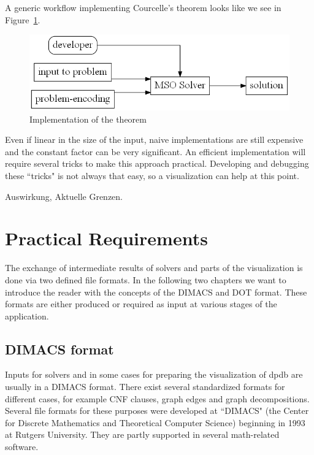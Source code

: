 \documentclass[a4paper, 12pt, bibliography=totoc]{scrartcl}
\begin{document}
\noindent
A generic workflow implementing Courcelle's theorem looks like we see in Figure~\ref{fig:UsageCourcelle}.
\begin{figure}[H]
	\includegraphics[height=0.2\textheight]{images/UsageCourcelle.gv.png}
	\caption{Implementation of the theorem}
	\label{fig:UsageCourcelle}
\end{figure}

Even if linear in the size of the input, naive implementations are still expensive and 
the constant factor can be very significant. An efficient implementation will require several tricks to make this approach practical. Developing and debugging these ``tricks" is not always that easy, so a visualization can help at this point.\smallskip 

Auswirkung, Aktuelle Grenzen.

\newpage
\section{Practical Requirements}\label{sec:practicalreq}
The exchange of intermediate results of solvers and parts of the visualization is done via two defined file formats. In the following two chapters we want to introduce the reader with the concepts of the DIMACS and DOT format. These formats are either produced or required as input at various stages of the application.
  
\subsection{DIMACS format}

Inputs for solvers and in some cases for preparing the visualization of dpdb are usually in a DIMACS format. There exist several standardized formats for different cases, for example CNF clauses, graph edges and graph decompositions.
Several file formats for these purposes were developed at ``DIMACS" (the Center for Discrete Mathematics and Theoretical Computer Science) \cite{dimacsimplcha} beginning in 1993 at Rutgers University.
They are partly supported in several math-related software.
\end{document}
